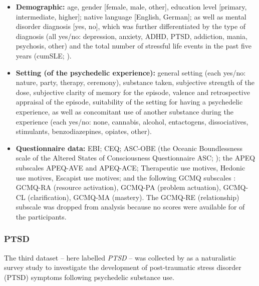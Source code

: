 \documentclass[man,floatsintext]{apa7}
\newcommand{\change}[1]{#1}
\begin{document}
\begin{itemize}

    \item \textbf{Demographic:} age, gender [female, male, other], education level [primary, intermediate, higher]; native language [English, German]; as well as mental disorder diagnosis [yes, no], which was further differentiated by the type of diagnosis (all yes/no: depression, anxiety, ADHD, PTSD, addiction, mania, psychosis, other) and the total number of stressful life events in the past five years (cumSLE; \cite{seery2010whatever}).  


    \item \textbf{Setting (of the psychedelic experience):} general setting (each yes/no: nature, party, therapy, ceremony), substance taken, subjective strength of the dose,  subjective clarity of memory for the episode, valence and retrospective appraisal of the episode, suitability of the setting for having a psychedelic experience, as well as concomitant use of another substance during the experience (each yes/no: \change{none,} cannabis, alcohol, entactogens, dissociatives, stimulants, benzodiazepines, opiates, other). 

    
    \item \textbf{Questionnaire data:} EBI; CEQ; ASC-OBE (the Oceanic Boundlessness scale of the Altered States of Consciousness Questionnaire ASC; \cite{dittrich1998standardized,studerus2010psychometric}); the \change{APEQ subscales
    APEQ-AVE and APEQ-ACE;} Therapeutic use motives, Hedonic use motives, Escapist use motives; and  the following GCMQ subscales \parencite{wolff2024measuring}: GCMQ-RA (resource activation), GCMQ-PA (problem actuation), GCMQ-CL (clarification), GCMQ-MA (mastery). The GCMQ-RE (relationship) subscale was dropped from analysis because no scores were available for  of the  participants.
    
\end{itemize}


\subsubsection{PTSD}

The third dataset -- here labelled \emph{PTSD} -- was collected by \textcite{evens2026post} as a naturalistic survey study to investigate the development of post-traumatic stress disorder (PTSD) symptoms following psychedelic substance use. 
\end{document}
